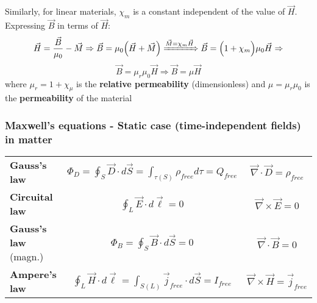 \documentclass[english,11pt]{article}
\begin{document}
Similarly, for linear materials,
$\chi_m$ is a constant independent of the value of $\vec{H}$.
Expressing $\vec{B}$ in terms of $\vec{H}$:
\begin{equation*}
  \vec{H} = \frac{\vec{B}}{\mu_0} - \vec{M} \Rightarrow
  \vec{B} = \mu_0 \Big( \vec{H} + \vec{M} \Big) \xRightarrow{\vec{M} = \chi_{m} \vec{H}}
  \vec{B} = \Big(1 + \chi_{m} \Big) \mu_0  \vec{H} \Rightarrow
\end{equation*}
\begin{equation*}
  \vec{B} = \mu_r \mu_0 \vec{H} \Rightarrow
  \vec{B} = \mu \vec{H}
\end{equation*}
where $\mu_r = 1+\chi_{\mu}$
is the {\bf relative permeability} (dimensionless) and
$\mu = \mu_r  \mu_0$ is the {\bf permeability} of the material


\subsubsection*{\bf Maxwell's equations - Static case (time-independent fields) in matter}

{\small
\begin{center}
  \begin{table}[H]
    \begin{tabular}{|l|c|c|}
      \hline
      {\bf Gauss's law} &
        $\Phi_{D} = \displaystyle \oint_{S} \vec{D} \cdot d\vec{S} =  \int_{\tau(S)} \rho_{free} d\tau = Q_{free}$ &
        $\displaystyle \vec{\nabla} \cdot \vec{D} = \rho_{free}$ \\

      {\bf Circuital law} &
        $\displaystyle \oint_{L} \vec{E} \cdot d\vec{\ell} = 0$ &
        $\displaystyle \vec{\nabla} \times \vec{E} = 0$ \\

      {\bf Gauss's law} (magn.) &
        $\Phi_{B} = \displaystyle \oint_{S} \vec{B} \cdot d\vec{S} = 0$ &
        $\displaystyle \vec{\nabla} \cdot \vec{B} = 0$ \\

      {\bf Ampere's law} &
        $\displaystyle \oint_{L} \vec{H} \cdot d\vec{\ell} =  \int_{S(L)} \vec{j}_{free} \cdot d\vec{S} = I_{free}$ &
        $\displaystyle \vec{\nabla} \times \vec{H} = \vec{j}_{free}$ \\
      \hline
    \end{tabular}
  \end{table}
\end{center}
}
\end{document}
